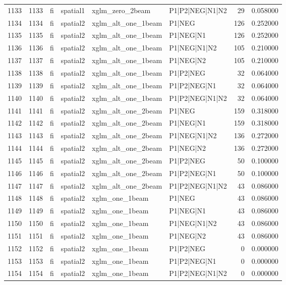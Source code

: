 \begin{tabular}{lrllllrr}
1133 & 1133 & fi & spatial1 & xglm_zero_2beam & P1|P2|NEG|N1|N2 & 29 & 0.058000 \\
1134 & 1134 & fi & spatial2 & xglm_alt_one_1beam & P1|NEG & 126 & 0.252000 \\
1135 & 1135 & fi & spatial2 & xglm_alt_one_1beam & P1|NEG|N1 & 126 & 0.252000 \\
1136 & 1136 & fi & spatial2 & xglm_alt_one_1beam & P1|NEG|N1|N2 & 105 & 0.210000 \\
1137 & 1137 & fi & spatial2 & xglm_alt_one_1beam & P1|NEG|N2 & 105 & 0.210000 \\
1138 & 1138 & fi & spatial2 & xglm_alt_one_1beam & P1|P2|NEG & 32 & 0.064000 \\
1139 & 1139 & fi & spatial2 & xglm_alt_one_1beam & P1|P2|NEG|N1 & 32 & 0.064000 \\
1140 & 1140 & fi & spatial2 & xglm_alt_one_1beam & P1|P2|NEG|N1|N2 & 32 & 0.064000 \\
1141 & 1141 & fi & spatial2 & xglm_alt_one_2beam & P1|NEG & 159 & 0.318000 \\
1142 & 1142 & fi & spatial2 & xglm_alt_one_2beam & P1|NEG|N1 & 159 & 0.318000 \\
1143 & 1143 & fi & spatial2 & xglm_alt_one_2beam & P1|NEG|N1|N2 & 136 & 0.272000 \\
1144 & 1144 & fi & spatial2 & xglm_alt_one_2beam & P1|NEG|N2 & 136 & 0.272000 \\
1145 & 1145 & fi & spatial2 & xglm_alt_one_2beam & P1|P2|NEG & 50 & 0.100000 \\
1146 & 1146 & fi & spatial2 & xglm_alt_one_2beam & P1|P2|NEG|N1 & 50 & 0.100000 \\
1147 & 1147 & fi & spatial2 & xglm_alt_one_2beam & P1|P2|NEG|N1|N2 & 43 & 0.086000 \\
1148 & 1148 & fi & spatial2 & xglm_one_1beam & P1|NEG & 43 & 0.086000 \\
1149 & 1149 & fi & spatial2 & xglm_one_1beam & P1|NEG|N1 & 43 & 0.086000 \\
1150 & 1150 & fi & spatial2 & xglm_one_1beam & P1|NEG|N1|N2 & 43 & 0.086000 \\
1151 & 1151 & fi & spatial2 & xglm_one_1beam & P1|NEG|N2 & 43 & 0.086000 \\
1152 & 1152 & fi & spatial2 & xglm_one_1beam & P1|P2|NEG & 0 & 0.000000 \\
1153 & 1153 & fi & spatial2 & xglm_one_1beam & P1|P2|NEG|N1 & 0 & 0.000000 \\
1154 & 1154 & fi & spatial2 & xglm_one_1beam & P1|P2|NEG|N1|N2 & 0 & 0.000000 \\

\end{tabular}
